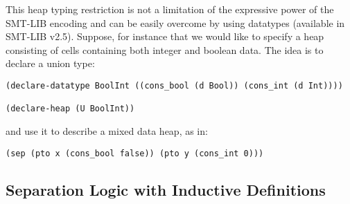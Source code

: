 \documentclass[10pt]{llncs}
\begin{document}

This heap typing restriction is not a limitation of the expressive
power of the SMT-LIB encoding and can be easily overcome by using
datatypes (available in SMT-LIB v2.5). Suppose, for instance that we
would like to specify a heap consisting of cells containing both
integer and boolean data. The idea is to declare a union type: 
\begin{Verbatim}
(declare-datatype BoolInt ((cons_bool (d Bool)) (cons_int (d Int))))

(declare-heap (U BoolInt))
\end{Verbatim}
and use it to describe a mixed data heap, as in: 
\begin{Verbatim}
(sep (pto x (cons_bool false)) (pto y (cons_int 0)))
\end{Verbatim}


\subsection{Separation Logic with Inductive Definitions}
\end{document}
